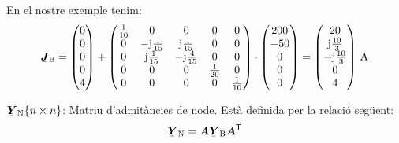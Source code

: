 \begin{list}{}
   En el nostre exemple tenim:
   \[
      \mcmplx{J}\ped{B} =
      \begin{pmatrix} 0 \\ 0 \\ 0 \\ 0 \\ 4 \end{pmatrix} +
      \begin{pmatrix}
            \frac{1}{10} & 0 & 0 & 0 & 0 \\
            0 & -\ju\frac{1}{15} & \ju\frac{1}{15} & 0 & 0 \\
            0 & \ju\frac{1}{15} & -\ju\frac{4}{15} & 0 & 0 \\
            0 & 0 & 0 & \frac{1}{20} & 0 \\
            0 & 0 & 0 & 0 & \frac{1}{10}
      \end{pmatrix} \cdot
      \begin{pmatrix} 200 \\ -50 \\ 0 \\ 0 \\ 0 \end{pmatrix} =
      \begin{pmatrix} 20 \\ \ju\frac{10}{3} \\ -\ju\frac{10}{3} \\ 0 \\ 4 \end{pmatrix}
     \unit{A}
   \]

   \item[$\mcmplx{Y}\ped{N}\{n\times n\}$:] Matriu d'admit\`{a}ncies de node. Est\`{a} definida per la relaci\'{o} seg\"{u}ent:
   \begin{equation}
      \mcmplx{Y}\ped{N} = \boldsymbol{A} \mcmplx{Y}\ped{B}
      \transp{\boldsymbol{A}}
   \end{equation}


\end{list}

